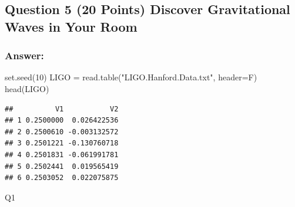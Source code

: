 \documentclass[
]{article}
\newenvironment{Shaded}{\begin{snugshade}}{\end{snugshade}}
\newcommand{\AttributeTok}[1]{\textcolor[rgb]{0.77,0.63,0.00}{#1}}
\newcommand{\DecValTok}[1]{\textcolor[rgb]{0.00,0.00,0.81}{#1}}
\newcommand{\FunctionTok}[1]{\textcolor[rgb]{0.00,0.00,0.00}{#1}}
\newcommand{\NormalTok}[1]{#1}
\newcommand{\OtherTok}[1]{\textcolor[rgb]{0.56,0.35,0.01}{#1}}
\newcommand{\StringTok}[1]{\textcolor[rgb]{0.31,0.60,0.02}{#1}}
\begin{document}
\hypertarget{question-5-20-points-discover-gravitational-waves-in-your-room}{%
\subsection{Question 5 (20 Points) Discover Gravitational Waves in Your
Room}\label{question-5-20-points-discover-gravitational-waves-in-your-room}}

\hypertarget{answer-1}{%
\subsubsection{Answer:}\label{answer-1}}

\begin{Shaded}
\begin{Highlighting}[]
\FunctionTok{set.seed}\NormalTok{(}\DecValTok{10}\NormalTok{)}
\NormalTok{LIGO }\OtherTok{=} \FunctionTok{read.table}\NormalTok{(}\StringTok{"LIGO.Hanford.Data.txt"}\NormalTok{, }\AttributeTok{header=}\NormalTok{F)}
\FunctionTok{head}\NormalTok{(LIGO)}
\end{Highlighting}
\end{Shaded}

\begin{verbatim}
##          V1           V2
## 1 0.2500000  0.026422536
## 2 0.2500610 -0.003132572
## 3 0.2501221 -0.130760718
## 4 0.2501831 -0.061991781
## 5 0.2502441  0.019565419
## 6 0.2503052  0.022075875
\end{verbatim}

Q1
\end{document}
